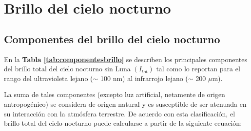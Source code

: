 \section{Brillo del cielo nocturno}
\label{sec:brillocielonocturno}

\subsection{Componentes del brillo del cielo nocturno}
\label{subsec:componentesbrillocielo}

En la \textbf{Tabla \ref{tab:componentesbrillo}} se describen los principales componentes del brillo total del cielo nocturno sin Luna $(I_{tot})$ tal como \cite{Leinert1998} lo reportan para el rango del ultravioleta lejano ($\sim$ 100 nm) al infrarrojo lejano ($\sim$ 200 $\mu$m).


\begin{table}[htb]
\centering
\caption{Componentes del brillo del cielo nocturno \citep{Leinert1998}}
\label{tab:componentesbrillo}
\end{table}

La suma de tales componentes (excepto luz artificial, netamente de origen antropogénico) se considera de origen natural y es susceptible de ser atenuada en su interacción con la atmósfera terrestre. De acuerdo con esta clasificación, el brillo total del cielo nocturno puede calcularse a partir de la siguiente ecuación:

